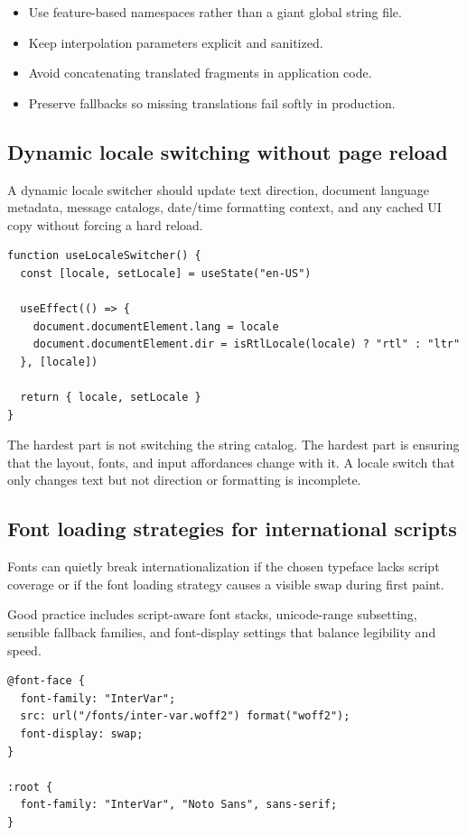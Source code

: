 \begin{itemize}[leftmargin=*, itemsep=0.35em]
  \item Use feature-based namespaces rather than a giant global string file.
  \item Keep interpolation parameters explicit and sanitized.
  \item Avoid concatenating translated fragments in application code.
  \item Preserve fallbacks so missing translations fail softly in production.
\end{itemize}

\subsection{Dynamic locale switching without page reload}
A dynamic locale switcher should update text direction, document language metadata, message catalogs, date/time formatting context, and any cached UI copy without forcing a hard reload.

\begin{verbatim}
function useLocaleSwitcher() {
  const [locale, setLocale] = useState("en-US")

  useEffect(() => {
    document.documentElement.lang = locale
    document.documentElement.dir = isRtlLocale(locale) ? "rtl" : "ltr"
  }, [locale])

  return { locale, setLocale }
}
\end{verbatim}

The hardest part is not switching the string catalog. The hardest part is ensuring that the layout, fonts, and input affordances change with it. A locale switch that only changes text but not direction or formatting is incomplete.

\subsection{Font loading strategies for international scripts}
Fonts can quietly break internationalization if the chosen typeface lacks script coverage or if the font loading strategy causes a visible swap during first paint.

Good practice includes script-aware font stacks, unicode-range subsetting, sensible fallback families, and font-display settings that balance legibility and speed.

\begin{verbatim}
@font-face {
  font-family: "InterVar";
  src: url("/fonts/inter-var.woff2") format("woff2");
  font-display: swap;
}

:root {
  font-family: "InterVar", "Noto Sans", sans-serif;
}
\end{verbatim}

